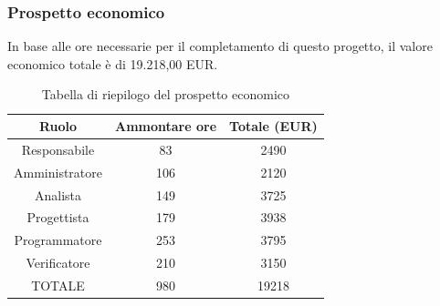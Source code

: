 \subsubsection{Prospetto economico}
In base alle ore necessarie per il completamento di questo progetto, il valore economico totale è di 19.218,00 EUR.
\begin{table}[h]
\caption{Tabella di riepilogo del prospetto economico}  
\begin{center}
\begin{tabular}{ |c|c|c|  }
 \hline
 Ruolo 		& Ammontare ore 	& Totale (EUR)\\
 \hline
 \hline
 	Responsabile	& 83 		& 2490\\
	Amministratore	& 106		& 2120\\
	Analista		& 149 		& 3725\\
	Progettista		& 179		& 3938\\
	Programmatore	& 253		& 3795\\
	Verificatore	& 210 		& 3150\\
 \hline\hline
 TOTALE		& 980		& 19218\\
  \hline
\end{tabular}
\end{center}
\end{table}

